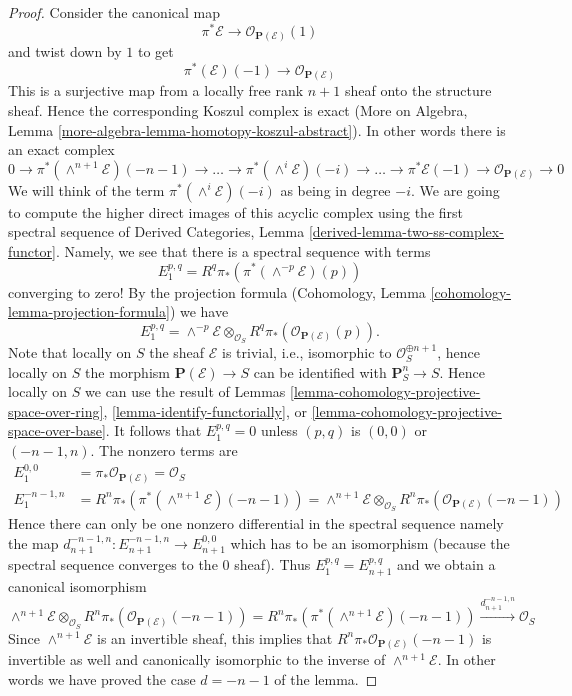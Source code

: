 \documentclass{stacks-project}
\theoremstyle{plain}
\theoremstyle{definition}
\theoremstyle{remark}
\numberwithin{equation}{subsection}
\begin{document}
\begin{proof}
Consider the canonical map
$$
\pi^*\mathcal{E} \longrightarrow \mathcal{O}_{\mathbf{P}(\mathcal{E})}(1)
$$
and twist down by $1$ to get
$$
\pi^*(\mathcal{E})(-1) \longrightarrow \mathcal{O}_{\mathbf{P}(\mathcal{E})}
$$
This is a surjective map from a locally free rank $n + 1$ sheaf onto
the structure sheaf. Hence the corresponding Koszul complex is
exact (More on Algebra, Lemma
\ref{more-algebra-lemma-homotopy-koszul-abstract}).
In other words there is an exact complex
$$
0 \to
\pi^*(\wedge^{n + 1}\mathcal{E})(-n - 1) \to
\ldots \to
\pi^*(\wedge^i\mathcal{E})(-i) \to
\ldots \to
\pi^*\mathcal{E}(-1) \to
\mathcal{O}_{\mathbf{P}(\mathcal{E})} \to 0
$$
We will think of the term $\pi^*(\wedge^i\mathcal{E})(-i)$ as being
in degree $-i$.
We are going to compute the higher direct images
of this acyclic complex using the first spectral sequence of
Derived Categories, Lemma \ref{derived-lemma-two-ss-complex-functor}.
Namely, we see that there is a spectral sequence with terms
$$
E_1^{p, q} = R^q\pi_*\left(\pi^*(\wedge^{-p}\mathcal{E})(p)\right)
$$
converging to zero! By the projection formula
(Cohomology, Lemma \ref{cohomology-lemma-projection-formula})
we have
$$
E_1^{p, q} = \wedge^{-p} \mathcal{E} \otimes_{\mathcal{O}_S}
R^q\pi_*\left(\mathcal{O}_{\mathbf{P}(\mathcal{E})}(p)\right).
$$
Note that locally on $S$ the sheaf $\mathcal{E}$ is trivial,
i.e., isomorphic to $\mathcal{O}_S^{\oplus n + 1}$, hence locally on
$S$ the morphism $\mathbf{P}(\mathcal{E}) \to S$ can be identified
with $\mathbf{P}^n_S \to S$. Hence
locally on $S$ we can use the result of Lemmas
\ref{lemma-cohomology-projective-space-over-ring},
\ref{lemma-identify-functorially}, or
\ref{lemma-cohomology-projective-space-over-base}.
It follows that $E_1^{p, q} = 0$ unless $(p, q)$ is $(0, 0)$
or $(-n - 1, n)$. The nonzero terms are
\begin{align*}
E_1^{0, 0} & = \pi_*\mathcal{O}_{\mathbf{P}(\mathcal{E})} = \mathcal{O}_S \\
E_1^{-n - 1, n} & =
R^n\pi_*\left(\pi^*(\wedge^{n + 1}\mathcal{E})(-n - 1)\right) =
\wedge^{n + 1}\mathcal{E} \otimes_{\mathcal{O}_S}
R^n\pi_*\left(\mathcal{O}_{\mathbf{P}(\mathcal{E})}(-n - 1)\right)
\end{align*}
Hence there can only be one nonzero
differential in the spectral sequence namely the map
$d_{n + 1}^{-n - 1, n} : E_{n + 1}^{-n - 1, n} \to E_{n + 1}^{0, 0}$
which has to be an isomorphism (because the spectral sequence converges
to the $0$ sheaf). Thus $E_1^{p, q} = E_{n + 1}^{p, q}$ and
we obtain a canonical isomorphism
$$
\wedge^{n + 1}\mathcal{E} \otimes_{\mathcal{O}_S}
R^n\pi_*\left(\mathcal{O}_{\mathbf{P}(\mathcal{E})}(-n - 1)\right) =
R^n\pi_*\left(\pi^*(\wedge^{n + 1}\mathcal{E})(-n - 1)\right)
\xrightarrow{d_{n + 1}^{-n - 1, n}}
\mathcal{O}_S
$$
Since $\wedge^{n + 1}\mathcal{E}$ is an invertible
sheaf, this implies that
$R^n\pi_*\mathcal{O}_{\mathbf{P}(\mathcal{E})}(-n - 1)$ is invertible
as well and canonically isomorphic to the inverse of
$\wedge^{n + 1}\mathcal{E}$. In other words we have proved the case
$d = - n - 1$ of the lemma.


\end{proof}
\end{document}
